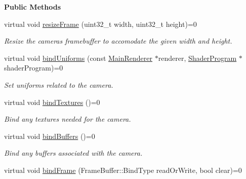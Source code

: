 \begin{Indent}\textbf{ Public Methods}\par
\begin{DoxyCompactItemize}
\item 
virtual void \mbox{\hyperlink{classrev_1_1_abstract_camera_aaa1843c3653515e93eecc2a255d32987}{resize\+Frame}} (uint32\+\_\+t width, uint32\+\_\+t height)=0
\begin{DoxyCompactList}\small\item\em Resize the camera\textquotesingle{}s framebuffer to accomodate the given width and height. \end{DoxyCompactList}\item 
virtual void \mbox{\hyperlink{classrev_1_1_abstract_camera_a6dceba3b328d5e9c3543975e3ae370c0}{bind\+Uniforms}} (const \mbox{\hyperlink{classrev_1_1_main_renderer}{Main\+Renderer}} $\ast$renderer, \mbox{\hyperlink{classrev_1_1_shader_program}{Shader\+Program}} $\ast$shader\+Program)=0
\begin{DoxyCompactList}\small\item\em Set uniforms related to the camera. \end{DoxyCompactList}\item 
\mbox{\label{classrev_1_1_abstract_camera_a27c02726ef16129f81c42b637859dcbd}} 
virtual void \mbox{\hyperlink{classrev_1_1_abstract_camera_a27c02726ef16129f81c42b637859dcbd}{bind\+Textures}} ()=0
\begin{DoxyCompactList}\small\item\em Bind any textures needed for the camera. \end{DoxyCompactList}\item 
\mbox{\label{classrev_1_1_abstract_camera_a670e279bf3c32bd0b7ac8ab5f9bbf6f2}} 
virtual void \mbox{\hyperlink{classrev_1_1_abstract_camera_a670e279bf3c32bd0b7ac8ab5f9bbf6f2}{bind\+Buffers}} ()=0
\begin{DoxyCompactList}\small\item\em Bind any buffers associated with the camera. \end{DoxyCompactList}\item 
\mbox{\label{classrev_1_1_abstract_camera_a996ec62c38c396b52c381034541e7958}} 
virtual void \mbox{\hyperlink{classrev_1_1_abstract_camera_a996ec62c38c396b52c381034541e7958}{bind\+Frame}} (Frame\+Buffer\+::\+Bind\+Type read\+Or\+Write, bool clear)=0

\end{DoxyCompactItemize}
\end{Indent}
